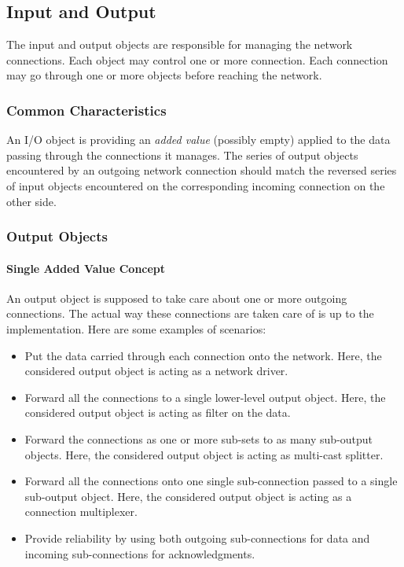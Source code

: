 \documentclass[11pt]{book}
\begin{document}
\subsection{Input and Output}
\label{sec:input-output}

The input and output objects are responsible for managing the network
connections. Each object may control one or more connection. Each
connection may go through one or more objects before reaching the
network.

%
\subsubsection{Common Characteristics}
\label{sec:comm-char}
An I/O object is providing an \emph{added value} (possibly empty)
applied to the data passing through the connections it manages. The
series of output objects encountered by an outgoing network connection
should match the reversed series of input objects encountered on the
corresponding incoming connection on the other side.

%
\subsubsection{Output Objects}
\label{sec:output-objects}


\paragraph{Single Added Value Concept}
\label{sec:single-added-value}

An output object is supposed to take care about one or more outgoing
connections. The actual way these connections are taken care of is up
to the implementation. Here are some examples of scenarios:
\begin{itemize}

\item Put the data carried through each connection onto the network.
  Here, the considered output object is acting as a network driver.

\item Forward all the connections to a single lower-level output
  object. Here, the considered output object is acting as filter on
  the data.

\item Forward the connections as one or more sub-sets to as many
  sub-output objects. Here, the considered output object is acting as
  multi-cast splitter.

\item Forward all the connections onto one single sub-connection
  passed to a single sub-output object. Here, the considered output
  object is acting as a connection multiplexer.

\item Provide reliability by using both outgoing sub-connections for
  data and incoming sub-connections for acknowledgments.

\end{itemize}
\end{document}
